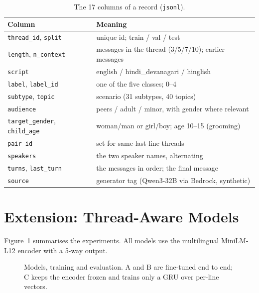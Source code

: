\documentclass[sigconf,9pt]{acmart}
\begin{document}
\begin{table}[h!]
\centering
\caption{The 17 columns of a record (\texttt{jsonl}).}
\label{tab:schema}
\footnotesize
\begin{tabularx}{\linewidth}{@{}l X@{}}
\toprule
\textbf{Column} & \textbf{Meaning} \\
\midrule
\texttt{thread\_id}, \texttt{split} & unique id; train / val / test \\
\texttt{length}, \texttt{n\_context} & messages in the thread (3/5/7/10); earlier messages \\
\texttt{script} & english / hindi\_devanagari / hinglish \\
\texttt{label}, \texttt{label\_id} & one of the five classes; 0--4 \\
\texttt{subtype}, \texttt{topic} & scenario (31 subtypes, 40 topics) \\
\texttt{audience} & peers / adult / minor, with gender where relevant \\
\texttt{target\_gender}, \texttt{child\_age} & woman/man or girl/boy; age 10--15 (grooming) \\
\texttt{pair\_id} & set for same-last-line threads \\
\texttt{speakers} & the two speaker names, alternating \\
\texttt{turns}, \texttt{last\_turn} & the messages in order; the final message \\
\texttt{source} & generator tag (Qwen3-32B via Bedrock, synthetic) \\
\bottomrule
\end{tabularx}
\end{table}

\section{Extension: Thread-Aware Models}\label{sec:models}
Figure~\ref{fig:training} summarises the experiments. All models use the multilingual MiniLM-L12 encoder \cite{reimers2020multilingual,wang2020minilm} with a 5-way output.

\begin{figure}[!t]
  \centering
  \resizebox{\textwidth}{!}{}
  \caption{Models, training and evaluation. A and B are fine-tuned end to end; C keeps the encoder frozen and trains only a GRU \cite{cho2014gru} over per-line vectors.}
  \label{fig:training}
\end{figure}
\end{document}

